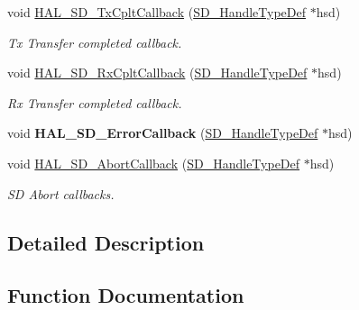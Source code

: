 \begin{DoxyCompactItemize}
\item 
void \mbox{\hyperlink{group___s_d___exported___functions___group2_ga7f42b31026c697fea97c132e9aed15e2}{H\+A\+L\+\_\+\+S\+D\+\_\+\+Tx\+Cplt\+Callback}} (\mbox{\hyperlink{group___s_d___exported___types___group3_ga1f31eb64a86b0c740bb5c02fa4c9914d}{S\+D\+\_\+\+Handle\+Type\+Def}} $\ast$hsd)
\begin{DoxyCompactList}\small\item\em Tx Transfer completed callback. \end{DoxyCompactList}\item 
void \mbox{\hyperlink{group___s_d___exported___functions___group2_ga1720dc3a0e88b26e557ae63fad3a382d}{H\+A\+L\+\_\+\+S\+D\+\_\+\+Rx\+Cplt\+Callback}} (\mbox{\hyperlink{group___s_d___exported___types___group3_ga1f31eb64a86b0c740bb5c02fa4c9914d}{S\+D\+\_\+\+Handle\+Type\+Def}} $\ast$hsd)
\begin{DoxyCompactList}\small\item\em Rx Transfer completed callback. \end{DoxyCompactList}\item 
\mbox{\label{group___s_d___exported___functions___group2_gae1bc0358c9232abc5f3beb338276608b}} 
void {\bfseries H\+A\+L\+\_\+\+S\+D\+\_\+\+Error\+Callback} (\mbox{\hyperlink{group___s_d___exported___types___group3_ga1f31eb64a86b0c740bb5c02fa4c9914d}{S\+D\+\_\+\+Handle\+Type\+Def}} $\ast$hsd)
\item 
void \mbox{\hyperlink{group___s_d___exported___functions___group2_ga52a463063ce8c6f1e8910f30dd4e8376}{H\+A\+L\+\_\+\+S\+D\+\_\+\+Abort\+Callback}} (\mbox{\hyperlink{group___s_d___exported___types___group3_ga1f31eb64a86b0c740bb5c02fa4c9914d}{S\+D\+\_\+\+Handle\+Type\+Def}} $\ast$hsd)
\begin{DoxyCompactList}\small\item\em SD Abort callbacks. \end{DoxyCompactList}\end{DoxyCompactItemize}


\subsection{Detailed Description}


\subsection{Function Documentation}
\mbox{\label{group___s_d___exported___functions___group2_ga52a463063ce8c6f1e8910f30dd4e8376}} 
